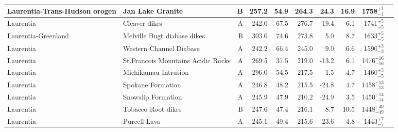 \begin{longtable}{p{1 in}p{1 in}rrrrrrrp{1.5 in}}
 Laurentia-Trans-Hudson orogen &                                 Jan Lake Granite &      B &     257.2 &      54.9 & 264.3 &  24.3 &      16.9 &     1758$^{+1}_{-1}$ &                                   \cite{Gala1995a} \\ \hline
                     Laurentia &                                    Cleaver dikes &      A &     242.0 &      67.5 & 276.7 &  19.4 &       6.1 &     1741$^{+5}_{-5}$ &                                  \cite{Irving2004a} \\ \hline
           Laurentia-Greenland &                      Melville Bugt diabase dikes &      B &     303.0 &      74.6 & 273.8 &   5.0 &       8.7 &     1633$^{+5}_{-5}$ &                                  \cite{Halls2011a} \\ \hline
                     Laurentia &                          Western Channel Diabase &      A &     242.2 &      66.4 & 245.0 &   9.0 &       6.6 &     1590$^{+3}_{-3}$ &                                 \cite{Irving1972a} \\ \hline
                     Laurentia &               St.Francois Mountains Acidic Rocks &      A &     269.5 &      37.5 & 219.0 & -13.2 &       6.1 &   1476$^{+16}_{-16}$ &                                  \cite{Meert2002b} \\ \hline
                     Laurentia &                             Michikamau Intrusion &      A &     296.0 &      54.5 & 217.5 &  -1.5 &       4.7 &     1460$^{+5}_{-5}$ &                                 \cite{Emslie1976a} \\ \hline
                     Laurentia &                                Spokane Formation &      A &     246.8 &      48.2 & 215.5 & -24.8 &       4.7 &   1458$^{+13}_{-13}$ &                                 \cite{Elston2002a} \\ \hline
                     Laurentia &                               Snowslip Formation &      A &     245.9 &      47.9 & 210.2 & -24.9 &       3.5 &   1450$^{+14}_{-14}$ &                                 \cite{Elston2002a} \\ \hline
                     Laurentia &                               Tobacco Root dikes &      B &     247.6 &      47.4 & 216.1 &   8.7 &      10.5 &   1448$^{+49}_{-49}$ &                                 \cite{Harlan2008a} \\ \hline
                     Laurentia &                                     Purcell Lava &      A &     245.1 &      49.4 & 215.6 & -23.6 &       4.8 &     1443$^{+7}_{-7}$ &                                 \cite{Elston2002a} \\ \hline

\end{longtable}
